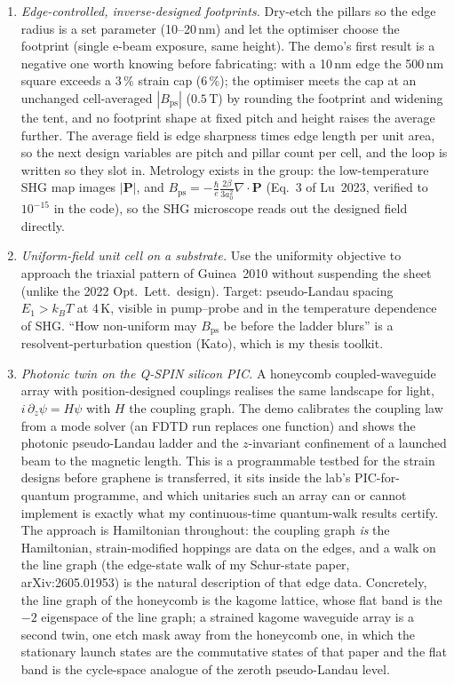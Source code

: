 \documentclass[10pt,a4paper]{article}
\newcommand{\Bps}{B_{\mathrm{ps}}}
\begin{document}
\begin{enumerate}
\item \emph{Edge-controlled, inverse-designed footprints.} Dry-etch the pillars so the edge radius is a set parameter (10--20\,nm) and let the optimiser choose the footprint (single e-beam exposure, same height). The demo's first result is a negative one worth knowing before fabricating: with a 10\,nm edge the 500\,nm square exceeds a 3\,\% strain cap (6\,\%); the optimiser meets the cap at an unchanged cell-averaged $|\Bps|$ ($0.5$\,T) by rounding the footprint and widening the tent, and no footprint shape at fixed pitch and height raises the average further. The average field is edge sharpness times edge length per unit area, so the next design variables are pitch and pillar count per cell, and the loop is written so they slot in. Metrology exists in the group: the low-temperature SHG map images $|\mathbf P|$, and $\Bps=-\tfrac{\hbar}{e}\tfrac{2\beta}{3a_0^2}\nabla\!\cdot\!\mathbf P$ (Eq.~3 of Lu~2023, verified to $10^{-15}$ in the code), so the SHG microscope reads out the designed field directly.
\item \emph{Uniform-field unit cell on a substrate.} Use the uniformity objective to approach the triaxial pattern of Guinea~2010 without suspending the sheet (unlike the 2022 Opt.\ Lett.\ design). Target: pseudo-Landau spacing $E_1>k_BT$ at 4\,K, visible in pump--probe and in the temperature dependence of SHG. ``How non-uniform may $\Bps$ be before the ladder blurs'' is a resolvent-perturbation question (Kato), which is my thesis toolkit.
\item \emph{Photonic twin on the Q-SPIN silicon PIC.} A honeycomb coupled-waveguide array with position-designed couplings realises the same landscape for light, $i\,\partial_z\psi=H\psi$ with $H$ the coupling graph. The demo calibrates the coupling law from a mode solver (an FDTD run replaces one function) and shows the photonic pseudo-Landau ladder and the $z$-invariant confinement of a launched beam to the magnetic length. This is a programmable testbed for the strain designs before graphene is transferred, it sits inside the lab's PIC-for-quantum programme, and which unitaries such an array can or cannot implement is exactly what my continuous-time quantum-walk results certify. The approach is Hamiltonian throughout: the coupling graph \emph{is} the Hamiltonian, strain-modified hoppings are data on the edges, and a walk on the line graph (the edge-state walk of my Schur-state paper, arXiv:2605.01953) is the natural description of that edge data. Concretely, the line graph of the honeycomb is the kagome lattice, whose flat band is the $-2$ eigenspace of the line graph; a strained kagome waveguide array is a second twin, one etch mask away from the honeycomb one, in which the stationary launch states are the commutative states of that paper and the flat band is the cycle-space analogue of the zeroth pseudo-Landau level.
\end{enumerate}
\end{document}
